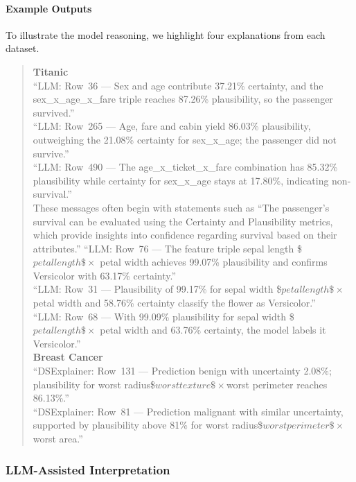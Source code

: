 \documentclass[acmlarge]{acmart}
\begin{document}
\paragraph{Example Outputs}
To illustrate the model reasoning, we highlight four explanations from each dataset.
\begin{quote}
\textbf{Titanic}\\

``LLM: Row~36 --- Sex and age contribute 37.21\% certainty, and the sex\_x\_age\_x\_fare triple reaches 87.26\% plausibility, so the passenger survived.''\\
``LLM: Row~265 --- Age, fare and cabin yield 86.03\% plausibility, outweighing the 21.08\% certainty for sex\_x\_age; the passenger did not survive.''\\
``LLM: Row~490 --- The age\_x\_ticket\_x\_fare combination has 85.32\% plausibility while certainty for sex\_x\_age stays at 17.80\%, indicating non-survival.''\\
These messages often begin with statements such as ``The passenger's survival can be evaluated using the Certainty and Plausibility metrics, which provide insights into confidence regarding survival based on their attributes.''
``LLM: Row~76 --- The feature triple sepal length \$\times$ petal length \$\times$ petal width achieves 99.07\% plausibility and confirms Versicolor with 63.17\% certainty.''\\
``LLM: Row~31 --- Plausibility of 99.17\% for sepal width \$\times$ petal length \$\times$ petal width and 58.76\% certainty classify the flower as Versicolor.''\\
``LLM: Row~68 --- With 99.09\% plausibility for sepal width \$\times$ petal length \$\times$ petal width and 63.76\% certainty, the model labels it Versicolor.''\\
\textbf{Breast Cancer}\\
``DSExplainer: Row~131 --- Prediction benign with uncertainty 2.08\%; plausibility for worst radius\$\times$worst texture\$\times$worst perimeter reaches 86.13\%.''\\
``DSExplainer: Row~81 --- Prediction malignant with similar uncertainty, supported by plausibility above 81\% for worst radius\$\times$worst perimeter\$\times$worst area.''\\
\end{quote}
\subsubsection{LLM-Assisted Interpretation}
\end{document}
